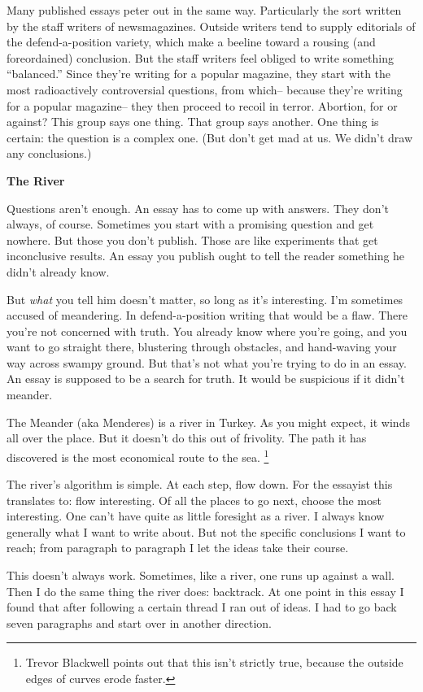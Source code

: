 \documentclass[12pt]{book}
\begin{document}
Many published essays peter out in the same way. Particularly the sort
written by the staff writers of newsmagazines. Outside writers tend to
supply editorials of the defend-a-position variety, which make a beeline
toward a rousing (and foreordained) conclusion. But the staff writers
feel obliged to write something ``balanced.'' Since they're writing for
a popular magazine, they start with the most radioactively controversial
questions, from which-- because they're writing for a popular magazine--
they then proceed to recoil in terror. Abortion, for or against? This
group says one thing. That group says another. One thing is certain: the
question is a complex one. (But don't get mad at us. We didn't draw any
conclusions.)

\textbf{The River}

Questions aren't enough. An essay has to come up with answers. They
don't always, of course. Sometimes you start with a promising question
and get nowhere. But those you don't publish. Those are like experiments
that get inconclusive results. An essay you publish ought to tell the
reader something he didn't already know.

But \emph{what} you tell him doesn't matter, so long as it's
interesting. I'm sometimes accused of meandering. In defend-a-position
writing that would be a flaw. There you're not concerned with truth. You
already know where you're going, and you want to go straight there,
blustering through obstacles, and hand-waving your way across swampy
ground. But that's not what you're trying to do in an essay. An essay is
supposed to be a search for truth. It would be suspicious if it didn't
meander.

The Meander (aka Menderes) is a river in Turkey. As you might expect, it
winds all over the place. But it doesn't do this out of frivolity. The
path it has discovered is the most economical route to the sea. \footnote{Trevor Blackwell points out that this isn't strictly true,
because the outside edges of curves erode faster.}

The river's algorithm is simple. At each step, flow down. For the
essayist this translates to: flow interesting. Of all the places to go
next, choose the most interesting. One can't have quite as little
foresight as a river. I always know generally what I want to write
about. But not the specific conclusions I want to reach; from paragraph
to paragraph I let the ideas take their course.

This doesn't always work. Sometimes, like a river, one runs up against a
wall. Then I do the same thing the river does: backtrack. At one point
in this essay I found that after following a certain thread I ran out of
ideas. I had to go back seven paragraphs and start over in another
direction.
\end{document}
